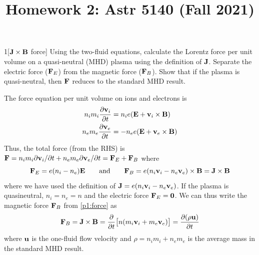 \documentclass[12pt]{article}
\title{Homework 2: Astr 5140 (Fall 2021)}
\begin{document}
\maketitle

\begin{problem}{1}[$\vb{J}\times\vb{B}$ force]
Using the two-fluid equations, calculate the Lorentz force per unit volume on a
quasi-neutral (MHD) plasma using the definition of $\vb{J}$. Separate the
electric force ($\vb{F}_E$) from the magnetic force ($\vb{F}_B$). Show that if
the plasma is quasi-neutral, then $\vb{F}$ reduces to the standard MHD result.
\begin{solution}
    The force equation per unit volume on ions and electrons is
    \begin{subequations}\label{p1:force}
        \begin{align}
            n_im_i\frac{\partial\vb{v}_i}{\partial t}
            &=n_ie\qty(\vb{E}+\vb{v}_i\times\vb{B})\\
            n_em_e\frac{\partial\vb{v}_e}{\partial t}
            &=-n_ee\qty(\vb{E}+\vb{v}_e\times\vb{B})
        \end{align} 
    \end{subequations}
    Thus, the total force (from the RHS) is
    $\vb{F}=n_im_i\partial\vb{v}_i/\partial
    t+n_em_e\partial\vb{v}_e/\partial t=\vb{F}_E+\vb{F}_B$ where
    \begin{equation}
        \vb{F}_E=e(n_i-n_e)\vb{E}\qquad\text{and}\qquad
        \vb{F}_B=e(n_i\vb{v}_i-n_e\vb{v}_e)\times\vb{B}=\vb{J}\times\vb{B}
    \end{equation}
    where we have used the definition of $\vb{J}=e(n_i\vb{v}_i-n_e\vb{v}_e)$. If
    the plasma is quasineutral, $n_i=n_e=n$ and the electric force
    $\vb{F}_E=\vb{0}$. We can thus write the magnetic force $\vb{F}_B$ from
    \eqref{p1:force} as
    \begin{equation}
        \vb{F}_B=\vb{J}\times\vb{B}=\frac{\partial}{\partial
        t}\qty[n(m_i\vb{v}_i+m_e\vb{v}_e)]=\frac{\partial(\rho\vb{u})}{\partial
    t} 
    \end{equation}
    where $\vb{u}$ is the one-fluid flow velocity and $\rho=n_im_i+n_em_e$ is
    the average mass in the standard MHD result.
\end{solution}
\end{problem}
\end{document}
